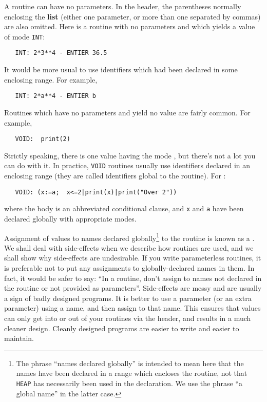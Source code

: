 A routine can have no parameters. In the header, the parentheses
normally enclosing the 
\textbf{list} (either one parameter, or more than one separated by
commas) are also omitted.  Here is a routine with no parameters and
which yields a value of mode \verb|INT|:
\begin{verbatim}
   INT: 2*3**4 - ENTIER 36.5
\end{verbatim}
\noindent
It would be more usual to use identifiers which had been declared in
some enclosing range. For example,
\begin{verbatim}
   INT: 2*a**4 - ENTIER b
\end{verbatim}
\noindent
Routines which have no parameters and yield no value are fairly
common.  For example,
\begin{verbatim}
   VOID:  print(2)
\end{verbatim}
\noindent
Strictly speaking, there is one value having the mode ,
but there's not a lot you can do with it. In practice, \verb|VOID|
routines usually use identifiers declared in an enclosing range (they
are called identifiers global to the routine). For
:
\begin{verbatim}
   VOID: (x:=a;  x<=2|print(x)|print("Over 2"))
\end{verbatim}
\noindent
where the body is an abbreviated conditional clause, and \verb|x| and
\verb|a| have been declared globally with appropriate modes.

Assignment of values to names declared globally\footnote{The phrase
``names declared globally'' is intended to mean here that the names
have been declared in a range which encloses the routine, not that
\texttt{HEAP} has necessarily been used in the declaration. We use
the phrase ``a global name'' in the latter case.} to the routine is
known as a . We shall deal with side-effects when
we describe how routines are used, and we shall show why side-effects
are undesirable.  If you write parameterless routines, it is
preferable not to put any assignments to globally-declared names in
them. In fact, it would be safer to say: ``In a routine, don't assign
to names not declared in the routine or not provided as parameters''.
Side-effects are messy and are usually a sign of badly designed
programs.  It is better to use a parameter (or an extra parameter)
using a name, and then assign to that name.  This ensures that values
can only get into or out of your routines via the header, and results
in a much cleaner design.  Cleanly designed programs are easier to
write and easier to maintain.

